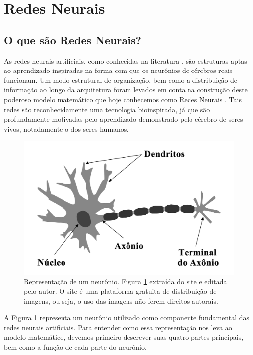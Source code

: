 \section{Redes Neurais}
\subsection{O que são Redes Neurais?}
\label{subsec:oquesaoredesneurais}

As redes neurais artificiais, como conhecidas na literatura \cite{haykin2004comprehensive, haykin2009neural, lecun2015deep}, são estruturas aptas ao aprendizado inspiradas na forma com que os neurônios de cérebros reais funcionam. Um modo estrutural de organização, bem como a distribuição de informação ao longo da arquitetura foram levados em conta na construção deste poderoso modelo matemático que hoje conhecemos como Redes Neurais \cite{haykin2004comprehensive, haykin2009neural, lecun2015deep}. Tais redes são reconhecidamente uma tecnologia bioinspirada, já que são profundamente motivadas pelo aprendizado demonstrado pelo cérebro de seres vivos, notadamente o dos seres humanos. 
\begin{figure}[b]
    \centering
    \includegraphics[scale=0.17]{Figuras/Cap2/neuronio.png}
        \caption{Representação de um neurônio. Figura \ref{fig:neuronio} extraída do site \cite{Pixabay} e editada pelo autor. O site \cite{Pixabay} é uma plataforma gratuita de distribuição de imagens, ou seja, o uso das imagens não ferem direitos autorais.}
        \label{fig:neuronio}
\end{figure}


A Figura \ref{fig:neuronio} representa um neurônio utilizado como componente fundamental das redes neurais artificiais. Para entender como essa representação nos leva ao modelo matemático, devemos primeiro descrever suas quatro partes principais, bem como a função de cada parte do neurônio.

